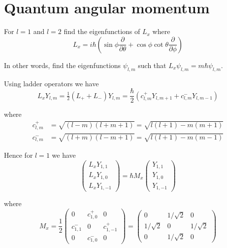 

\section*{Quantum angular momentum}

For $l=1$ and $l=2$ find the eigenfunctions of $L_x$ where
\begin{equation*}
L_x=i\hbar\left(
\sin\phi\frac{\partial}{\partial\theta}+\cos\phi\cot\theta\frac{\partial}{\partial\phi}
\right)
\end{equation*}

In other words, find the eigenfunctions $\psi_{l,m}$ such that $L_x\psi_{l,m}=m\hbar\psi_{l,m}$.

\bigskip
Using ladder operators we have
\begin{equation*}
L_xY_{l,m}=\tfrac{1}{2}(L_++L_-)Y_{l,m}
=\frac{\hbar}{2}\left(c_{l,m}^+Y_{l,m+1}+c_{l,m}^-Y_{l,m-1}\right)
\end{equation*}

where
\begin{align*}
c_{l,m}^+&=\sqrt{(l-m)(l+m+1)}=\sqrt{l(l+1)-m(m+1)}
\\
c_{l,m}^-&=\sqrt{(l+m)(l-m+1)}=\sqrt{l(l+1)-m(m-1)}
\end{align*}

Hence for $l=1$ we have
\begin{equation*}
\begin{pmatrix}L_xY_{1,1}\\[1ex]L_xY_{1,0}\\[1ex]L_xY_{1,-1}\end{pmatrix}
=
\hbar M_x\begin{pmatrix}Y_{1,1}\\[1ex]Y_{1,0}\\[1ex]Y_{1,-1}\end{pmatrix}
\end{equation*}

where
\begin{equation*}
M_x=\frac{1}{2}\begin{pmatrix}
0 & c_{1,0}^+ & 0
\\[1ex]
c_{1,1}^- & 0 & c_{1,-1}^+
\\[1ex]
0 & c_{1,0}^- & 0
\end{pmatrix}
=
\begin{pmatrix}
0 & 1/\sqrt2 & 0
\\[1ex]
1/\sqrt2 & 0 & 1/\sqrt2
\\[1ex]
0 & 1/\sqrt2 & 0
\end{pmatrix}
\end{equation*}

